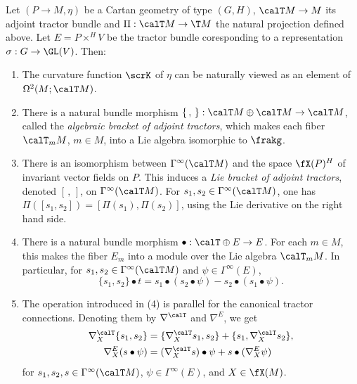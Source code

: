 \begin{prop}\label{prop 1.5.7 Cap}
    Let $(P\to M,\eta)$ be a Cartan geometry of type $(G,H)$, $\calT M\to M$ its adjoint tractor bundle and $\Pi:\calT M\to \T M$ the natural projection defined above. Let $E=P\times^H V$ be the tractor bundle coresponding to a representation $\sigma:G\to\GL(V)$. Then:
    \begin{enumerate}[label=(\arabic*)]
        \item The curvature function $\scrK$ of $\eta$ can be naturally viewed as an element of $\Omega^2(M;\calT M)$.
        \item There is a natural bundle morphism $\{\,,\,\}:\calT M\oplus\calT M\to \calT M$, called the \emph{algebraic bracket of adjoint tractors}, which makes each fiber $\calT_m M$, $m\in M$, into a Lie algebra isomorphic to $\frakg$.
        \item There is an isomorphism between $\Gamma^\infty(\calT M)$ and the space $\fX(P)^H$ of invariant vector fields on $P$. This induces a \emph{Lie bracket of adjoint tractors}, denoted $[\,,\,]$, on $\Gamma^\infty(\calT M)$. For $s_1,s_2\in\Gamma^\infty(\calT M)$, one has $\Pi([s_1,s_2])=[\Pi(s_1),\Pi(s_2)]$, using the Lie derivative on the right hand side.
        \item There is a natural bundle morphism $\bullet:\calT\oplus E\to E$. For each $m\in M$, this makes the fiber $E_m$ into a module over the Lie algebra $\calT_m M$. In particular, for $s_1,s_2\in\Gamma^\infty(\calT M)$ and $\psi\in \Gamma^\infty(E)$, 
        \[\{s_1,s_2\}\bullet t=s_1\bullet(s_2\bullet \psi)-s_2\bullet(s_1\bullet \psi).\]
        \item The operation introduced in (4) is parallel for the canonical tractor connections. Denoting them by $\nabla^\calT$ and $\nabla^E$, we get 
        \begin{align}
            \nabla^\calT_X\{s_1,s_2\}&=\{\nabla^\calT_X s_1,s_2\}+\{s_1,\nabla^\calT_X s_2\},\\
            \nabla^E_X(s\bullet \psi)&=(\nabla^\calT_X s)\bullet \psi+s\bullet (\nabla^E_X \psi)
        \end{align}
        for $s_1,s_2,s\in\Gamma^\infty(\calT M)$, $\psi\in\Gamma^\infty(E)$, and $X\in\fX(M)$.
    \end{enumerate}
\end{prop}

